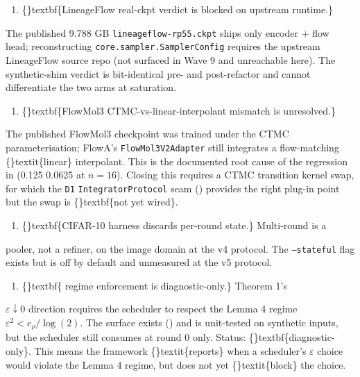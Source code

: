 \documentclass{article}
\begin{document}
\begin{enumerate}
\item \{\}textbf\{LineageFlow real-ckpt verdict is blocked on upstream runtime.\}
\end{enumerate}
The published 9.788 GB \texttt{lineageflow-rp55.ckpt} ships only encoder + flow head; reconstructing \texttt{core.sampler.SamplerConfig} requires the upstream LineageFlow source repo (not surfaced in Wave 9 and unreachable here). The synthetic-shim verdict is bit-identical pre- and post-refactor and cannot differentiate the two arms at saturation.

\begin{enumerate}
\item \{\}textbf\{FlowMol3 CTMC-vs-linear-interpolant mismatch is unresolved.\}
\end{enumerate}
The published FlowMol3 checkpoint was trained under the CTMC parameterisation; FlowA's \texttt{FlowMol3V2Adapter} still integrates a flow-matching \{\}textit\{linear\} interpolant. This is the documented root cause of the regression in  (0.125  0.0625 at $n=16$). Closing this requires a CTMC transition kernel swap, for which the \texttt{D1} \texttt{IntegratorProtocol} seam () provides the right plug-in point but the swap is \{\}textbf\{not yet wired\}.

\begin{enumerate}
\item \{\}textbf\{CIFAR-10 harness discards per-round state.\} Multi-round is a
\end{enumerate}
pooler, not a refiner, on the image domain at the v4 protocol. The \texttt{--stateful} flag exists but is off by default and unmeasured at the v5 protocol.

\begin{enumerate}
\item \{\}textbf\{ regime enforcement is diagnostic-only.\} Theorem 1's
\end{enumerate}
$\varepsilon \downarrow 0$ direction requires the scheduler to respect the Lemma 4 regime $\varepsilon^2 < e_\rho / \log(2)$. The  surface exists () and is unit-tested on synthetic inputs, but the scheduler still consumes  at round 0 only. Status: \{\}textbf\{diagnostic-only\}. This means the framework \{\}textit\{reports\} when a scheduler's $\varepsilon$ choice would violate the Lemma 4 regime, but does not yet \{\}textit\{block\} the choice.
\end{document}
